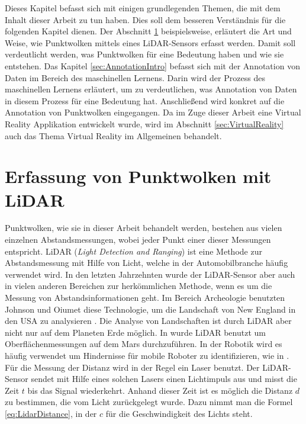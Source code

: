 \graphicspath{{Kapitel/Kapitel2_Grundlagen/Images/}}

Dieses Kapitel befasst sich mit einigen grundlegenden Themen, die mit dem Inhalt dieser Arbeit zu tun haben. Dies soll dem besseren Verständnis für die folgenden Kapitel dienen. Der Abschnitt \ref{sec:Lidar} beispielsweise, erläutert die Art und Weise, wie Punktwolken mittels eines LiDAR-Sensors erfasst werden. Damit soll verdeutlicht werden, was Punktwolken für eine Bedeutung haben und wie sie entstehen. Das Kapitel \ref{sec:AnnotationIntro} befasst sich mit der Annotation von Daten im Bereich des maschinellen Lernens. Darin wird der Prozess des maschinellen Lernens erläutert, um zu verdeutlichen, was Annotation von Daten in diesem Prozess für eine Bedeutung hat. Anschließend wird konkret auf die Annotation von Punktwolken eingegangen. Da im Zuge dieser Arbeit eine Virtual Reality Applikation entwickelt wurde, wird im Abschnitt \ref{sec:VirtualReality} auch das Thema Virtual Reality im Allgemeinen behandelt.

\section{Erfassung von Punktwolken mit LiDAR}
\label{sec:Lidar}

Punktwolken, wie sie in dieser Arbeit behandelt werden, bestehen aus vielen einzelnen Abstandsmessungen, wobei jeder Punkt einer dieser Messungen entspricht. LiDAR (\textit{Light Detection and Ranging}) ist eine Methode zur Abstandsmessung mit Hilfe von Licht, welche in der Automobilbranche häufig verwendet wird. In den letzten Jahrzehnten wurde der LiDAR-Sensor aber auch in vielen anderen Bereichen zur herkömmlichen Methode, wenn es um die Messung von Abstandsinformationen geht. Im Bereich Archeologie benutzten Johnson und Oiumet diese Technologie, um die Landschaft von New England in den USA zu analysieren \cite{bib:LidarArcheology}. Die Analyse von Landschaften ist durch LiDAR aber nicht nur auf dem Planeten Erde möglich. In \cite{bib:LidarSpace} wurde LiDAR benutzt um Oberflächenmessungen auf dem Mars durchzuführen. In der Robotik wird es häufig verwendet um Hindernisse für mobile Roboter zu identifizieren, wie in \cite{bib:LidarRobotic}.\\

Für die Messung der Distanz wird in der Regel ein Laser benutzt. Der LiDAR-Sensor sendet mit Hilfe eines solchen Lasers einen Lichtimpuls aus und misst die Zeit $t$ bis das Signal wiederkehrt. Anhand dieser Zeit ist es möglich die Distanz $d$ zu bestimmen, die vom Licht zurückgelegt wurde. Dazu nimmt man die Formel \ref{eq:LidarDistance}, in der $c$ für die Geschwindigkeit des Lichts steht.

